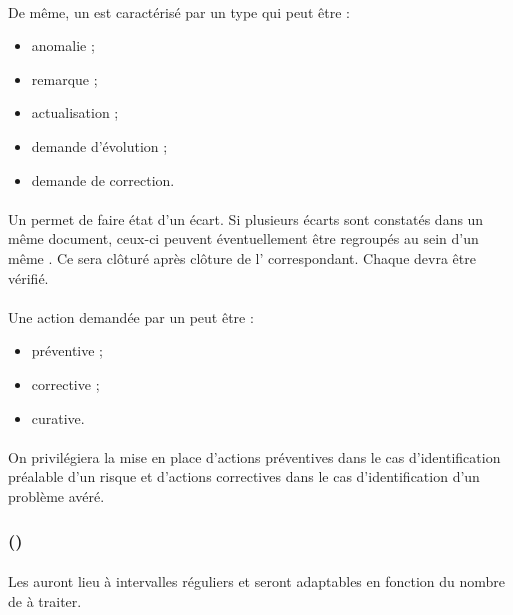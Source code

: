 \paragraph*{} De même, un \FTCourt{} est caractérisé par un type qui peut être :
\begin{itemize}
\item anomalie ;
\item remarque ;
\item actualisation ;
\item demande d'évolution ;
\item demande de correction.
\end{itemize}

\paragraph*{} Un \FTCourt{} permet de faire état d'un écart. Si plusieurs écarts sont constatés dans un même
document, ceux-ci peuvent éventuellement être regroupés au sein d'un même \FTCourt . Ce \FTCourt{} sera
clôturé après clôture de l'\OCCourt{} correspondant. Chaque \OCCourt{} devra être vérifié.
\paragraph*{} Une action demandée par un \OCCourt{} peut être :
\begin{itemize}
\item préventive ;
\item corrective ;
\item curative.
\end{itemize}

\paragraph*{} On privilégiera la mise en place d'actions préventives dans le cas d'identification préalable
d'un risque et d'actions correctives dans le cas d'identification d'un problème avéré.


\subsubsection*{\CTFT (\CTFTCourt)}
\paragraph*{} Les \CTFTCourt{} auront lieu à intervalles réguliers et seront adaptables en fonction du nombre de \FTCourt{} à
traiter.

